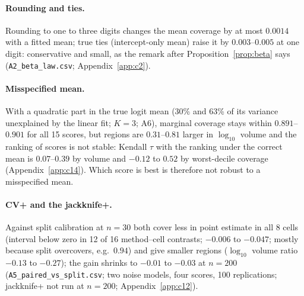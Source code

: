 \paragraph{Rounding and ties.}
Rounding to one to three digits changes the mean coverage by at most $0.0014$ with a fitted mean; true ties (intercept-only mean) raise it by $0.003$--$0.005$ at one digit: conservative and small, as the remark after Proposition~\ref{prop:beta} says (\texttt{A2\_beta\_law.csv}; Appendix~\ref{app:c2}).

\paragraph{Misspecified mean.}
With a quadratic part in the true logit mean (30\% and 63\% of its variance unexplained by the linear fit; $K=3$; A6), marginal coverage stays within $0.891$--$0.901$ for all 15 scores, but regions are $0.31$--$0.81$ larger in $\log_{10}$ volume and the ranking of scores is not stable: Kendall $\tau$ with the ranking under the correct mean is $0.07$--$0.39$ by volume and $-0.12$ to $0.52$ by worst-decile coverage (Appendix~\ref{app:c14}).
Which score is best is therefore not robust to a misspecified mean.

\paragraph{CV+ and the jackknife+.}
Against split calibration at $n=30$ both cover less in point estimate in all 8 cells (interval below zero in 12 of 16 method--cell contrasts; $-0.006$ to $-0.047$; mostly because split overcovers, e.g.\ $0.94$) and give smaller regions ($\log_{10}$ volume ratio $-0.13$ to $-0.27$); the gain shrinks to $-0.01$ to $-0.03$ at $n=200$ (\texttt{A5\_paired\_vs\_split.csv}; two noise models, four scores, 100 replications; jackknife+ not run at $n=200$; Appendix~\ref{app:c12}).
